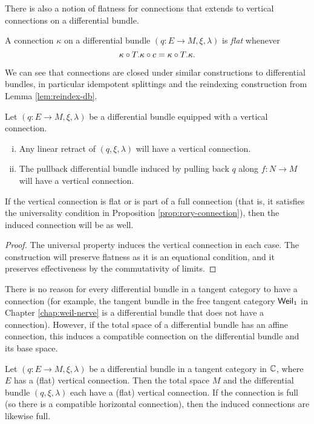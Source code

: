 There is also a notion of flatness for connections that extends to vertical connections on a differential bundle.
\begin{definition}
  A connection $\kappa$ on a differential bundle $(q:E \to M, \xi, \lambda)$ is \emph{flat} whenever
  \[ 
    \kappa \circ T.\kappa \circ c = \kappa \circ T.\kappa.
  \]
\end{definition}
We can see that connections are closed under similar constructions to differential bundles, in particular idempotent splittings and the reindexing construction from Lemma \ref{lem:reindex-db}.
\begin{lemma}%
  \label{lem:conn-const}
  Let $(q:E \to M, \xi, \lambda)$ be a differential bundle equipped with a vertical connection.
  \begin{enumerate}[(i)]
    \item Any linear retract of $(q,\xi,\lambda)$ will have a vertical connection. 
    \item The pullback differential bundle induced by pulling back $q$ along $f:N \to M$ will have a vertical connection.
  \end{enumerate}
  If the vertical connection is flat or is part of a full connection (that is, it satisfies the universality condition in Proposition \ref{prop:rory-connection}), then the induced connection will be as well.
\end{lemma}
\begin{proof}
  The universal property induces the vertical connection in each case. The construction will preserve flatness as it is an equational condition, and it preserves effectiveness by the commutativity of limits.
\end{proof}
There is no reason for every differential bundle in a tangent category to have a connection (for example, the tangent bundle in the free tangent category $\mathsf{Weil}_1$ in Chapter \ref{chap:weil-nerve} is a differential bundle that does not have a connection). However, if the total space of a differential bundle has an affine connection, this induces a compatible connection on the differential bundle and its base space.
\begin{theorem}
  \label{thm:linear-connection-from-total-space}
  Let $(q:E \to M, \xi, \lambda)$ be a differential bundle in a tangent category in $\mathbb{C}$, where $E$ has a (flat) vertical connection. Then the total space $M$ and the differential bundle $(q,\xi,\lambda)$ each have a (flat) vertical connection. If the connection is full (so there is a compatible horizontal connection), then the induced connections are likewise full.
\end{theorem}
